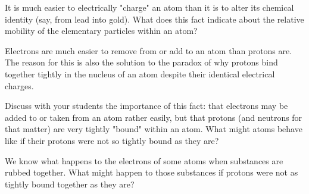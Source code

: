 

It is much easier to electrically "charge" an atom than it is to alter its chemical identity (say, from lead into gold).  What does this fact indicate about the relative mobility of the elementary particles within an atom?







Electrons are much easier to remove from or add to an atom than protons are.  The reason for this is also the solution to the paradox of why protons bind together tightly in the nucleus of an atom despite their identical electrical charges.







Discuss with your students the importance of this fact: that electrons may be added to or taken from an atom rather easily, but that protons (and neutrons for that matter) are very tightly "bound" within an atom.  What might atoms behave like if their protons were not so tightly bound as they are?  

We know what happens to the electrons of some atoms when substances are rubbed together.  What might happen to those substances if protons were not as tightly bound together as they are?





